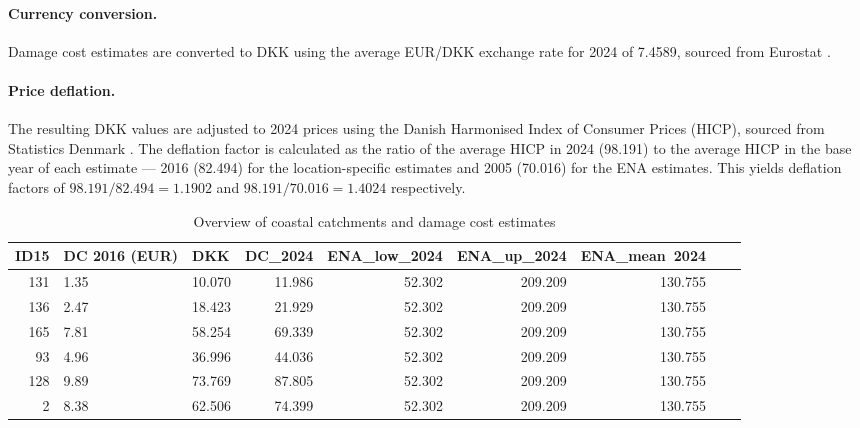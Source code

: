 \documentclass[12pt]{article}
\begin{document}
\paragraph {Currency conversion.} Damage cost estimates are converted to 
DKK using the average EUR/DKK exchange rate for 2024 of 7.4589, sourced from Eurostat \citep{Eurostat2024}.

\paragraph{Price deflation.} The resulting DKK values are adjusted to 2024 prices using the Danish Harmonised Index of Consumer Prices (HICP), sourced from Statistics Denmark \citep{DST2024HICP}. The deflation factor is 
calculated as the ratio of the average HICP in 2024 (98.191) to the average HICP in the base year of each estimate --- 2016 (82.494) for the location-specific estimates and 2005 (70.016) for the ENA estimates. This yields deflation factors of $98.191/82.494 = 1.1902$ and 
$98.191/70.016 = 1.4024$ respectively.

\begin{table}[H]
\label{fig:DC_calc}
\centering
\small
\begin{tabularx}{\textwidth}{r l l r r r r r r}
\toprule
ID15 & DC 2016 (EUR) & DKK & DC\_2024 & ENA\_low\_2024 & ENA\_up\_2024 & ENA\_mean\ 2024 \\
\midrule
131 &  1.35 & 10.070 & 11.986 & 52.302 & 209.209 & 130.755 \\
136 & 2.47 & 18.423 & 21.929 & 52.302 & 209.209 & 130.755 \\
165 & 7.81 & 58.254 & 69.339 & 52.302 & 209.209 & 130.755 \\
93  &  4.96 & 36.996 & 44.036 & 52.302 & 209.209 & 130.755 \\
128 & 9.89 & 73.769 & 87.805 & 52.302 & 209.209 & 130.755 \\
2   &  8.38 & 62.506 & 74.399 & 52.302 & 209.209 & 130.755 \\
\bottomrule
\end{tabularx}
\caption{Overview of coastal catchments and damage cost estimates}
\end{table}
\end{document}
